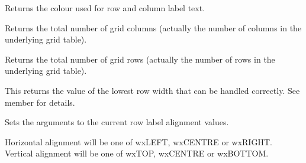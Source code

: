 Returns the colour used for row and column label text.



\label{wxgridgetnumbercols}


Returns the total number of grid columns (actually the number of columns in the underlying grid
table).



\label{wxgridgetnumberrows}


Returns the total number of grid rows (actually the number of rows in the underlying grid table).



\label{wxgridgetorcreatecellattr}




\label{wxgridgetrowminimalacceptableheight}


This returns the value of the lowest row width that can be handled correctly. See
member  for details.



\label{wxgridgetrowminimalheight}




\label{wxgridgetrowlabelalignment}


Sets the arguments to the current row label alignment values.

Horizontal alignment will be one of wxLEFT, wxCENTRE or wxRIGHT. \\
Vertical alignment will be one of wxTOP, wxCENTRE or wxBOTTOM.




